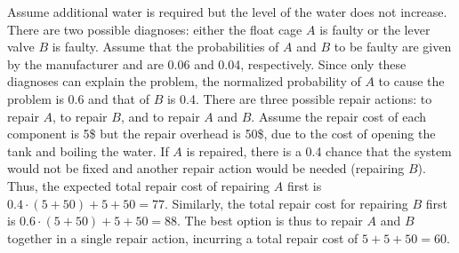 \documentclass[review]{elsarticle}
\begin{document}
Assume additional water is required but the level of the water does not increase. There are two possible diagnoses: either the float cage $A$ is faulty or the lever valve $B$ is faulty. Assume that the probabilities of $A$ and $B$ to be faulty are given by the manufacturer and are 0.06 and 0.04, respectively. Since only these diagnoses can explain the problem, the normalized probability of $A$ to cause the problem is 0.6 and that of $B$ is 0.4. There are three possible repair actions: to repair $A$, to repair $B$, and to repair $A$ and $B$. Assume the repair cost of each component is 5\$ but the repair overhead is 50\$, due to the cost of opening the tank and boiling the water. If $A$ is repaired, there is a 0.4 chance that the system would not be fixed and another repair action would be needed (repairing $B$). Thus, the expected total repair cost of repairing $A$ first is $0.4\cdot(5+50)+5+50=77$. Similarly, the total repair cost for repairing $B$ first is $0.6\cdot(5+50)+5+50=88$. The best option is thus to repair $A$ and $B$ together in a single repair action, incurring a total repair cost of $5+5+50=60$.





\end{document}

